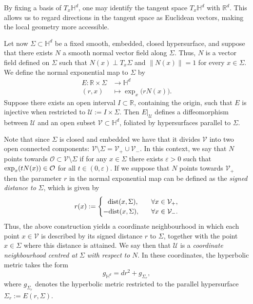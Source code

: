 \documentclass[12pt,longbibliography]{article}
\theoremstyle{definition}
\theoremstyle{remark}
\theoremstyle{example}
\begin{document}
By fixing a basis of \(T_x \mathbb{H}^d\), one may identify the tangent space \(T_x \mathbb{H}^d\) with \(\mathbb{R}^d\). This allows us to regard directions in the tangent space as Euclidean vectors, making the local geometry more accessible.  

Let now \(\Sigma \subset \mathbb{H}^d\) be a fixed smooth, embedded, closed hypersurface, and suppose that there exists \(N\) a smooth normal vector field along \(\Sigma\). Thus, $N$ is a vector field defined on $\Sigma$ such that \(N(x) \perp T_x \Sigma\) and $ \| N(x) \|=1$ for every \(x \in \Sigma\). We define the normal exponential map to \(\Sigma\) by  
\[
\begin{split}
	E : \mathbb{R} \times \Sigma &\longrightarrow \mathbb{H}^d \\
	(r,x) &\longmapsto \exp_x \big(r N(x)\big).
\end{split}
\]
Suppose there exists an open interval \(I \subset \mathbb{R}\), containing the origin, such that \(E\) is injective when restricted to \(\mathcal{U} := I \times \Sigma\). Then \(E|_{\mathcal{U}}\) defines a diffeomorphism between \(\mathcal{U}\) and an open subset \(\mathcal{V} \subset \mathbb{H}^d\), foliated by hypersurfaces parallel to \(\Sigma\).

Note that since $\Sigma$ is closed and embedded we have that it divides $\mathcal{V}$ into two open connected components: $\mathcal{V} \setminus \Sigma = \mathcal{V}_+ \cup \mathcal{V}_-$. In this context, we say that $N$ points towards $\mathcal{O} \subset \mathcal{V} \setminus \Sigma$ if for any $x \in \Sigma$ there exists $\varepsilon >0$ such that $\textup{exp}_x (t N(x)) \in \mathcal{O}$ for all $t \in (0, \varepsilon)$. If we suppose that $N$ points towards $\mathcal{V}_+$ then the parameter $r$ in the normal exponential map can be defined as the \textit{signed distance to} $\Sigma$, which is given by
\begin{equation}\label{signedDistance}\notag
	r(x):=\begin{cases}
		\, \, \,  \, \textup{dist} (x, \Sigma), \quad & \forall x\in\mathcal{V}_+,\\
		-\textup{dist} (x, \Sigma), & \forall x \in \mathcal{V}_-.
	\end{cases}
\end{equation}
Thus, the above construction yields a coordinate neighbourhood in which each point \(x \in \mathcal{V}\) is described by its signed distance \(r\) to \(\Sigma\), together with the point \(x \in \Sigma\) where this distance is attained. We say then that $\mathcal{U}$ is a \textit{coordinate neighbourhood centred at }$\Sigma$ \textit{with respect to} $N$. In these coordinates, the hyperbolic metric takes the form  
\[
g_{\mathbb{H}^d} = dr^2 + g_{\Sigma_r},
\]
where \(g_{\Sigma_r}\) denotes the hyperbolic metric restricted to the parallel hypersurface \(\Sigma_r := E(r,\Sigma)\).
\end{document}
